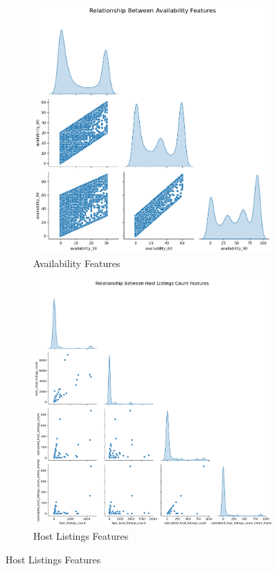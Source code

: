 \documentclass[12pt]{article}
\begin{document}
\begin{figure}[H]
\centering
\begin{subfigure}[b]{0.4\textwidth}
    \includegraphics[width=\textwidth]{images/availability_short.png}
    \caption{Availability Features}
    \label{fig:availability_short}
\end{subfigure}
\hfill
\begin{subfigure}[b]{0.4\textwidth}
    \includegraphics[width=\textwidth]{images/hlc_short.png}
    \caption{Host Listings Features}
    \label{fig:hlc_short}
\end{subfigure}


\end{figure}
\end{document}
